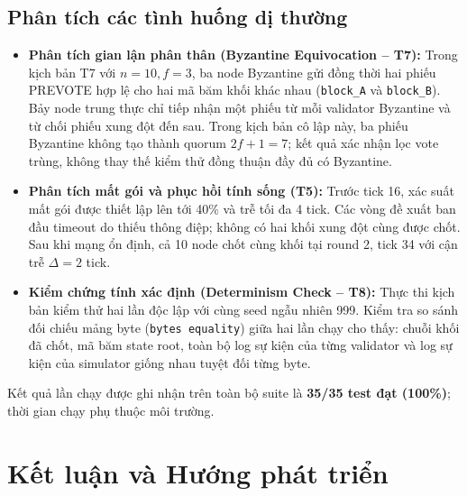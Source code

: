 \documentclass[10pt,a4paper]{report}
\begin{document}
\section{Phân tích các tình huống dị thường}
\begin{itemize}
  \item \textbf{Phân tích gian lận phân thân (Byzantine Equivocation -- T7):} Trong kịch bản T7 với $n = 10, f = 3$, ba node Byzantine gửi đồng thời hai phiếu PREVOTE hợp lệ cho hai mã băm khối khác nhau (\texttt{block\_A} và \texttt{block\_B}). Bảy node trung thực chỉ tiếp nhận một phiếu từ mỗi validator Byzantine và từ chối phiếu xung đột đến sau. Trong kịch bản cô lập này, ba phiếu Byzantine không tạo thành quorum $2f + 1 = 7$; kết quả xác nhận lọc vote trùng, không thay thế kiểm thử đồng thuận đầy đủ có Byzantine.
  \item \textbf{Phân tích mất gói và phục hồi tính sống (T5):} Trước tick 16, xác suất mất gói được thiết lập lên tới 40\% và trễ tối đa 4 tick. Các vòng đề xuất ban đầu timeout do thiếu thông điệp; không có hai khối xung đột cùng được chốt. Sau khi mạng ổn định, cả 10 node chốt cùng khối tại round 2, tick 34 với cận trễ $\Delta = 2$ tick.
  \item \textbf{Kiểm chứng tính xác định (Determinism Check -- T8):} Thực thi kịch bản kiểm thử hai lần độc lập với cùng seed ngẫu nhiên 999. Kiểm tra so sánh đối chiếu mảng byte (\texttt{bytes equality}) giữa hai lần chạy cho thấy: chuỗi khối đã chốt, mã băm state root, toàn bộ log sự kiện của từng validator và log sự kiện của simulator giống nhau tuyệt đối từng byte.
\end{itemize}

Kết quả lần chạy được ghi nhận trên toàn bộ suite là \textbf{35/35 test đạt (100\%)}; thời gian chạy phụ thuộc môi trường.

\chapter{Kết luận và Hướng phát triển}
\end{document}
